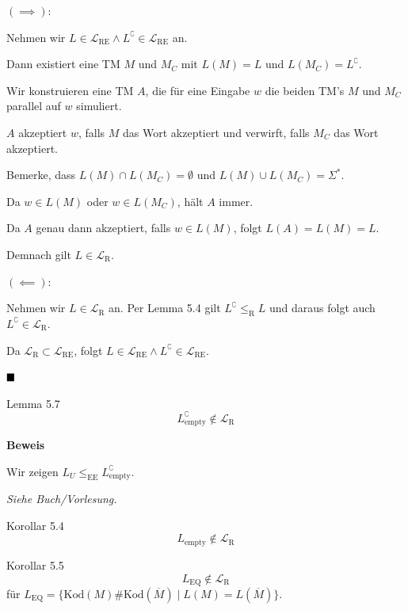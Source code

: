\documentclass[a4paper, 11pt]{article}
\def\Lre{\mathcal{L}_\text{RE}}
\def\Lr{\mathcal{L}_\text{R}}
\begin{document}
                    $\mathbf{(\implies):}$
                    
                    Nehmen wir $L \in \Lre \land L^\complement \in \Lre$ an.
                
                    Dann existiert eine TM $M$ und $M_C$ mit $L(M) = L$ und $L(M_C) = L^\complement$.
                
                    Wir konstruieren eine TM $A$, die für eine Eingabe $w$ die beiden TM's $M$ und $M_C$ parallel auf $w$ simuliert.
                    
                    $A$ akzeptiert $w$, falls $M$ das Wort akzeptiert und verwirft, falls $M_C$ das Wort akzeptiert.
                    
                    Bemerke, dass $L(M) \cap L(M_C) = \emptyset$ und $L(M) \cup L(M_C) = \Sigma^*$.
                
                    Da $w \in L(M)$ oder $w \in L(M_C)$, hält $A$ immer.
                
                    Da $A$ genau dann akzeptiert, falls $w \in L(M)$, folgt $L(A) = L(M) = L$.
                
                    Demnach gilt $L \in \Lr$.
                
                    
                    $\mathbf{(\impliedby):}$
                
                    Nehmen wir $L \in \Lr$ an. Per Lemma 5.4 gilt $L^\complement \leq_{\text{R}} L$ und daraus folgt auch $L^\complement \in \Lr$.
                
                    Da $\Lr \subset \Lre$, folgt $L \in \Lre \land L^\complement \in \Lre$.
                
                    $\hfill\blacksquare$
                
                
                    \begin{mainbox}{Lemma 5.7}
                        $$L_{\text{empty}}^\complement \notin \Lr$$
                    \end{mainbox}
                    \textbf{Beweis }
                
                    Wir zeigen $L_U \leq_{\text{EE}} L_{\text{empty}}^\complement$.
                
                    \textit{Siehe Buch/Vorlesung.}
                   
                
                    \begin{subbox}{Korollar 5.4}
                        $$L_{\text{empty}} \notin \Lr$$
                    \end{subbox}
                    \begin{subbox}{Korollar 5.5}
                        $$L_{\text{EQ}} \notin \Lr$$
                        für $L_{\text{EQ}} = \{\text{Kod}(M)\#\text{Kod}(\overline{M}) \mid L(M) = L(\overline{M})\}$.
                    \end{subbox}
                
\end{document}

